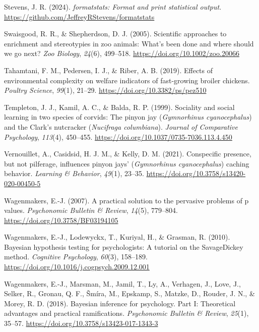 \documentclass[
  pub]{apa6}
\newlength{\cslhangindent}
\newlength{\cslentryspacingunit} %
\newenvironment{CSLReferences}[2] %
 {%
  \setlength{\parindent}{0pt}
  \ifodd #1
  \let\oldpar\par
  \def\par{\hangindent=\cslhangindent\oldpar}
  \fi
  \setlength{\parskip}{#2\cslentryspacingunit}
 }%
 {}
\begin{document}
\begin{CSLReferences}{1}{0}
\leavevmode{}%
Stevens, J. R. (2024). \emph{{formatstats}: Format and print statistical output}. \url{https://github.com/JeffreyRStevens/formatstats}

\leavevmode{}%
Swaisgood, R. R., \& Shepherdson, D. J. (2005). Scientific approaches to enrichment and stereotypies in zoo animals: What's been done and where should we go next? \emph{Zoo Biology}, \emph{24}(6), 499--518. \url{https://doi.org/10.1002/zoo.20066}

\leavevmode{}%
Tahamtani, F. M., Pedersen, I. J., \& Riber, A. B. (2019). Effects of environmental complexity on welfare indicators of fast-growing broiler chickens. \emph{Poultry Science}, \emph{99}(1), 21--29. \url{https://doi.org/10.3382/ps/pez510}

\leavevmode{}%
Templeton, J. J., Kamil, A. C., \& Balda, R. P. (1999). Sociality and social learning in two species of corvids: The pinyon jay (\emph{{Gymnorhinus} cyanocephalus}) and the {Clark}'s nutcracker (\emph{{Nucifraga} columbiana}). \emph{Journal of Comparative Psychology}, \emph{113}(4), 450--455. \url{https://doi.org/10.1037/0735-7036.113.4.450}

\leavevmode{}%
Vernouillet, A., Casidsid, H. J. M., \& Kelly, D. M. (2021). Conspecific presence, but not pilferage, influences pinyon jays' (\emph{{Gymnorhinus} cyanocephalus}) caching behavior. \emph{Learning \& Behavior}, \emph{49}(1), 23--35. \url{https://doi.org/10.3758/s13420-020-00450-5}

\leavevmode{}%
Wagenmakers, E.-J. (2007). A practical solution to the pervasive problems of p values. \emph{Psychonomic Bulletin \& Review}, \emph{14}(5), 779--804. \url{https://doi.org/10.3758/BF03194105}

\leavevmode{}%
Wagenmakers, E.-J., Lodewyckx, T., Kuriyal, H., \& Grasman, R. (2010). Bayesian hypothesis testing for psychologists: {A} tutorial on the {Savage}{\textendash}{Dickey} method. \emph{Cognitive Psychology}, \emph{60}(3), 158--189. \url{https://doi.org/10.1016/j.cogpsych.2009.12.001}

\leavevmode{}%
Wagenmakers, E.-J., Marsman, M., Jamil, T., Ly, A., Verhagen, J., Love, J., Selker, R., Gronau, Q. F., Šmíra, M., Epskamp, S., Matzke, D., Rouder, J. N., \& Morey, R. D. (2018). Bayesian inference for psychology. {Part I}: {Theoretical} advantages and practical ramifications. \emph{Psychonomic Bulletin \& Review}, \emph{25}(1), 35--57. \url{https://doi.org/10.3758/s13423-017-1343-3}


\end{CSLReferences}
\end{document}
